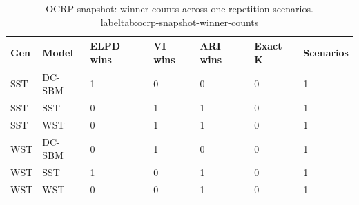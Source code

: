 \begin{table}[!h]
\centering
\caption{OCRP snapshot: winner counts across one-repetition scenarios.\\label{tab:ocrp-snapshot-winner-counts}}
\centering
\begin{tabular}[t]{lllllll}
\toprule
Gen & Model & ELPD wins & VI wins & ARI wins & Exact K & Scenarios\\
\midrule
SST & DC-SBM & 1 & 0 & 0 & 0 & 1\\
SST & SST & 0 & 1 & 1 & 0 & 1\\
SST & WST & 0 & 1 & 1 & 0 & 1\\
WST & DC-SBM & 0 & 1 & 0 & 0 & 1\\
WST & SST & 1 & 0 & 1 & 0 & 1\\
WST & WST & 0 & 0 & 1 & 0 & 1\\
\bottomrule
\end{tabular}
\end{table}
